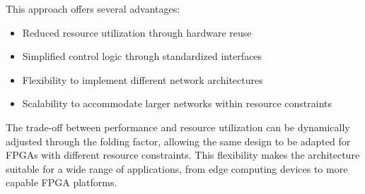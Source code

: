 This approach offers several advantages:
\begin{itemize}
    \item Reduced resource utilization through hardware reuse
    \item Simplified control logic through standardized interfaces
    \item Flexibility to implement different network architectures
    \item Scalability to accommodate larger networks within resource constraints
\end{itemize}

The trade-off between performance and resource utilization can be dynamically adjusted through the folding factor, allowing the same design to be adapted for FPGAs with different resource constraints. This flexibility makes the architecture suitable for a wide range of applications, from edge computing devices to more capable FPGA platforms.
